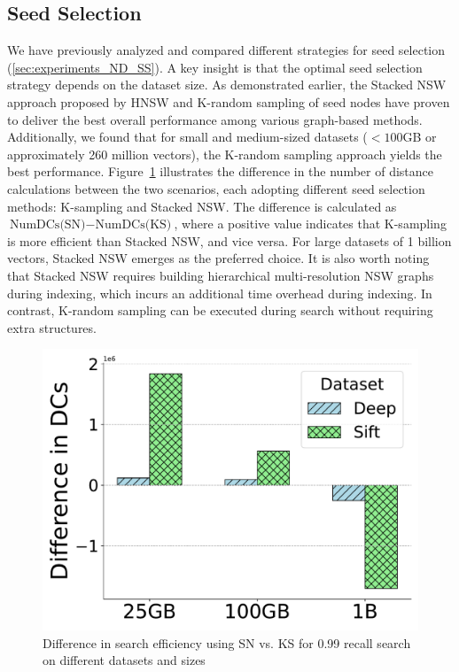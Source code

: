 \subsection{Seed Selection}
We have previously analyzed and compared different strategies for seed selection (\ref{sec:experiments_ND_SS}). A key insight is that the optimal seed selection strategy depends on the dataset size. As demonstrated earlier, the Stacked NSW approach proposed by HNSW and K-random sampling of seed nodes have proven to deliver the best overall performance among various graph-based methods. Additionally, we found that for small and medium-sized datasets (\(< 100\)GB or approximately 260 million vectors), the K-random sampling approach yields the best performance. Figure~\ref{fig:snvskd} illustrates the difference in the number of distance calculations between the two scenarios, each adopting different seed selection methods: K-sampling and Stacked NSW. The difference is calculated as \(\text{NumDCs(SN)} - \text{NumDCs(KS)}\), where a positive value indicates that K-sampling is more efficient than Stacked NSW, and vice versa. For large datasets of 1 billion vectors, Stacked NSW emerges as the preferred choice. It is also worth noting that Stacked NSW requires building hierarchical multi-resolution NSW graphs during indexing, which incurs an additional time overhead during indexing. In contrast, K-random sampling can be executed during search without requiring extra structures.

\begin{figure}[tb] 
\centering
		\captionsetup{justification=centering}
		\includegraphics[width=0.4\columnwidth]{../img/oigas/SS/DC_SS.pdf}
		\caption{Difference in search efficiency using SN vs. KS for 0.99 recall search on different datasets and sizes}    
		\label{fig:snvskd}
 \end{figure}
 
